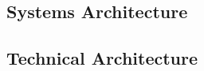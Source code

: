 \subsection{Systems Architecture}
\label{sec:systems-architecture}

\subsection{Technical Architecture} \label{sec:technical-architecture}


